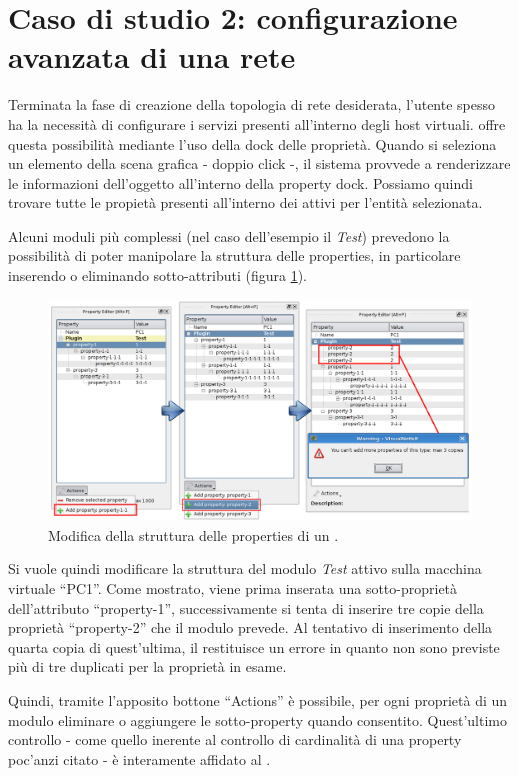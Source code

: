 \section{Caso di studio 2: configurazione avanzata di una rete}
Terminata la fase di creazione della topologia di rete desiderata, l'utente spesso ha la necessità di configurare i servizi presenti all'interno degli host virtuali. \visualnetkit{} offre questa possibilità mediante l'uso della dock delle proprietà.
Quando si seleziona un elemento della scena grafica - doppio click -, il sistema provvede a renderizzare le informazioni dell'oggetto all'interno della property dock. Possiamo quindi trovare tutte le propietà presenti all'interno dei \plugin{} attivi per l'entità selezionata.

Alcuni moduli più complessi (nel caso dell'esempio il \plugin{} \emph{Test}) prevedono la possibilità di poter manipolare la struttura delle properties, in particolare inserendo o eliminando sotto-attributi (figura \ref{figura:vn_ex_pp}).

\begin{figure}[!htb]
	\centering
	\includegraphics[width=13cm]{images/vnetkit_property_evolution.png}
	\caption{Modifica della struttura delle properties di un \plugin{}.}
	\label{figura:vn_ex_pp}
\end{figure}
Si vuole quindi modificare la struttura del modulo \emph{Test} attivo sulla macchina virtuale ``PC1''. Come mostrato, viene prima inserata una sotto-proprietà dell'attributo ``property-1'', successivamente si tenta di inserire tre copie della proprietà ``property-2'' che il modulo prevede.
Al tentativo di inserimento della quarta copia di quest'ultima, il \plugin{} restituisce un errore in quanto non sono previste più di tre duplicati per la proprietà in esame.

Quindi, tramite l'apposito bottone ``Actions'' è possibile, per ogni proprietà di un modulo eliminare o aggiungere le sotto-property quando consentito. Quest'ultimo controllo - come quello inerente al controllo di cardinalità di una property poc'anzi citato - è interamente affidato al \plugin{}.

